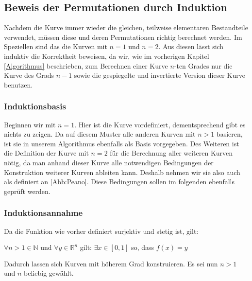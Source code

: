 \documentclass[course=asp]{aspdoc}
\begin{document}
\subsection{Beweis der Permutationen durch Induktion} \label{Beweis der Permutationen durch Induktion}
Nachdem die Kurve immer wieder die gleichen, teilweise elementaren Bestandteile verwendet, m\"ussen diese und deren Permutationen richtig berechnet werden. Im Speziellen sind das die Kurven mit $n = 1$ und $n = 2$. Aus diesen l\"asst sich induktiv die Korrektheit beweisen, da wir, wie im vorherigen Kapitel \ref{Algorithmus} beschrieben, zum Berechnen einer Kurve $n$-ten Grades nur die Kurve des Grads $n - 1$ sowie die gespiegelte und invertierte Version dieser Kurve benutzen.

\subsubsection{Induktionsbasis} \label{Induktionsbasis}
Beginnen wir mit $n = 1$. Hier ist die Kurve vordefiniert, dementsprechend gibt es nichts zu zeigen. Da auf diesem Muster alle anderen Kurven mit $n > 1$ basieren, ist sie in unserem Algorithmus ebenfalls als Basis vorgegeben.
Des Weiteren ist die Definition der Kurve mit $n = 2$ f\"ur die Berechnung aller weiteren Kurven n\"otig, da man anhand dieser Kurve alle notwendigen Bedingungen der Konstruktion weiterer Kurven ableiten kann. Deshalb nehmen wir sie also auch als definiert an \ref{Abb:Peano}. Diese Bedingungen sollen im folgenden ebenfalls gepr\"uft werden.

\subsubsection{Induktionsannahme} \label{Induktionsannahme}
Da die Funktion wie vorher definiert surjektiv und stetig ist, gilt:

\begin{center}
$\forall n > 1 \in \mathbb{N}$ und $\forall y \in \mathbb{R}^n$ gilt: $\exists x \in [0,1]$ so, dass $f(x)= y$
\end{center}

Dadurch lassen sich Kurven mit h\"oherem Grad konstruieren. Es sei nun $n > 1$ und $n$ beliebig gew\"ahlt.
\end{document}
